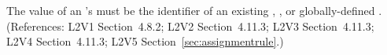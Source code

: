 The value of an \AssignmentRule's  must be the identifier
of an existing \Compartment, \Species, or globally-defined \Parameter.
(References: L2V1 Section~4.8.2; L2V2 Section~4.11.3; L2V3
Section~4.11.3; L2V4 Section~4.11.3; L2V5 Section~\ref{sec:assignmentrule}.)
